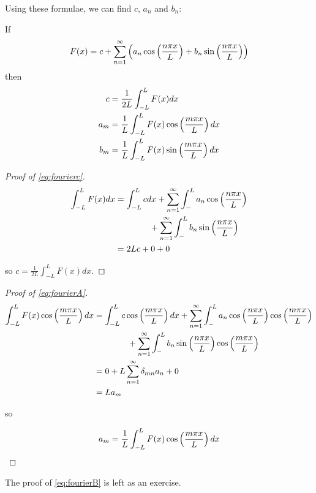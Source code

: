 Using these formulae, we can find $c$, $a_n$ and $b_n$:

\begin{thm}\label{thm:fouco}
If
\[F(x)=c+\sum_{n=1}^{\infty}\left(a_n\cos\left(\frac{n \pi x}{L}\right)+b_n\sin\left(\frac{n \pi x}{L}\right)\right)\]
then
\begin{align}
\label{eq:fourierc}
   c   &    = \frac{1}{2L}\int_{-L}^LF(x)dx\\
\label{eq:fourierA}
   a_m &    = \frac{1}{L}\int_{-L}^LF(x)\cos\left(\frac{m \pi x}{L}\right)dx\\
\label{eq:fourierB}
   b_m &    = \frac{1}{L}\int_{-L}^LF(x)\sin\left(\frac{m \pi x}{L}\right)dx
\end{align}
\end{thm}
\begin{proof}[Proof of \eqref{eq:fourierc}]
\begin{align*}
 \int_{-L}^LF(x)dx
        & = \int_{-L}^{L}cdx
            + \sum_{n=1}^{\infty}\int_{-}^La_n\cos\left(\frac{n \pi x}{L}\right)\\
&\qquad\qquad+ \sum_{n=1}^{\infty}\int_{-}^Lb_n\sin\left(\frac{n \pi x}{L}\right)\\
        & = 2Lc
            + 0
            + 0
\end{align*}

so $c=\frac{1}{2L}\int_{-L}^LF(x)dx$.
\end{proof}
\begin{proof}[Proof of \eqref{eq:fourierA}]
\begin{align*}
 \int_{-L}^LF(x)\cos\left(\frac{m \pi x}{L}\right)dx
        & = \int_{-L}^{L}c\cos\left(\frac{m \pi x}{L}\right)dx
            + \sum_{n=1}^{\infty}\int_{-}^La_n\cos\left(\frac{n \pi x}{L}\right)\cos\left(\frac{m \pi x}{L}\right)\\
&\qquad\qquad+ \sum_{n=1}^{\infty}\int_{-}^Lb_n\sin\left(\frac{n \pi x}{L}\right)\cos\left(\frac{m \pi x}{L}\right)\\
        & = 0
            + L\sum_{n=1}^{\infty}\delta_{mn}a_n
            + 0\\
        & = La_m
\end{align*}

so

\[
  a_m = \frac{1}{L}\int_{-L}^LF(x)\cos\left(\frac{m \pi x}{L}\right)dx
\]
\end{proof}

The proof of \eqref{eq:fourierB} is left as an exercise.

